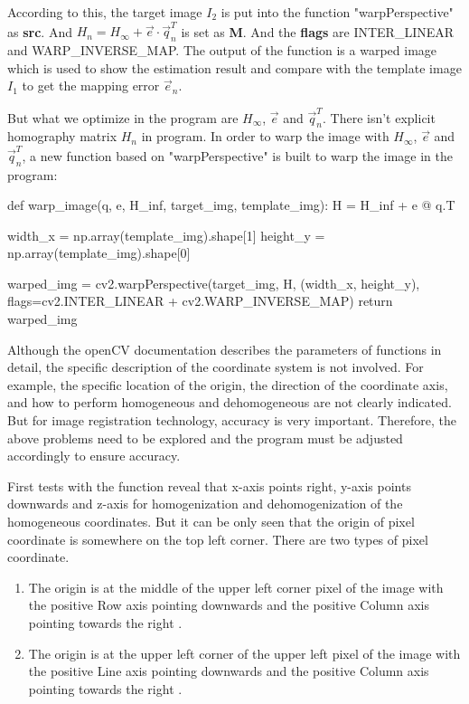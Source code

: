 According to this, the target image $I_2$ is put into the function "warpPerspective" as \textbf{src}. And $H_{n} = H_{\infty} + \vec{e} \cdot \vec{q}_{n}^T$ is set as \textbf{M}. And the \textbf{flags} are INTER\_LINEAR and WARP\_INVERSE\_MAP. The output of the function is a warped image which is used to show the estimation result and compare with the template image $I_1$ to get the mapping error $\vec{e}_n$. 

But what we optimize in the program are $H_{\infty}$,  $\vec{e}$ and $ \vec{q}_{n}^T$. There isn't explicit homography matrix $H_n$ in program. In order to warp the image with $H_{\infty}$,  $\vec{e}$ and $ \vec{q}_{n}^T$, a new function based on "warpPerspective" is built to warp the image in the program:
\begin{python}[caption={warp\_image},label={lst:warpimage}]
	def warp_image(q, e, H_inf, target_img, template_img):
		H = H_inf + e @ q.T
		
		width_x = np.array(template_img).shape[1]
		height_y = np.array(template_img).shape[0]
		
		warped_img = cv2.warpPerspective(target_img, H, (width_x, height_y),
		flags=cv2.INTER_LINEAR + cv2.WARP_INVERSE_MAP)
	return warped_img
\end{python}

Although the openCV documentation describes the parameters of functions in detail, the specific description of the coordinate system is not involved. For example, the specific location of the origin, the direction of the coordinate axis, and how to perform homogeneous and dehomogeneous are not clearly indicated. But for image registration technology, accuracy is very important. Therefore, the above problems need to be explored and the program must be adjusted accordingly to ensure accuracy.

First tests with the function reveal that x-axis points right, y-axis points downwards and z-axis for homogenization and dehomogenization of the homogeneous coordinates. But it can be only seen that the origin of pixel coordinate is somewhere on the top left corner. There are two types of pixel coordinate. 
\begin{enumerate}
	\item The origin is at the middle of the upper left corner pixel of the image with the positive Row axis pointing downwards and the positive Column axis pointing towards the right \cite{misbPhotogrammetryMetadataSet}.
	\item The origin is at the upper left corner of the upper left pixel of the image with the positive Line axis pointing downwards and the positive Column axis pointing towards the right \cite{misbPhotogrammetryMetadataSet}.
\end{enumerate}

